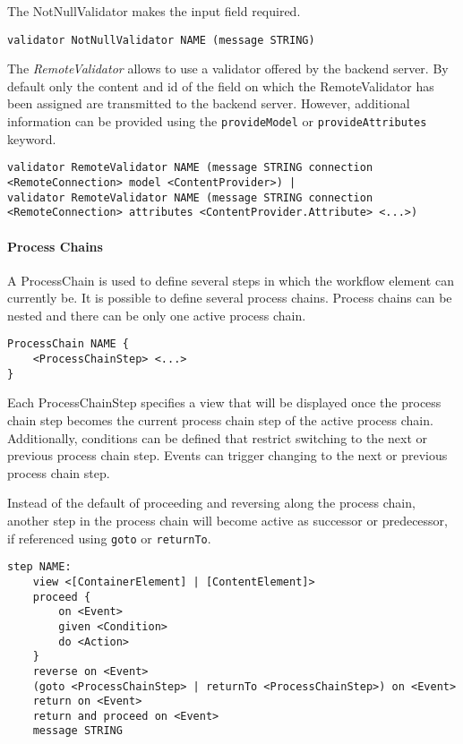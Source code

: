 The NotNullValidator makes the input field required.
\begin{lstlisting}
validator NotNullValidator NAME (message STRING)
\end{lstlisting}

The \textit{RemoteValidator} allows to use a validator offered by the backend server. By default only the content and id of the field on which the RemoteValidator has been assigned are transmitted to the backend server. However, additional information can be provided using the \lstinline!provideModel! or
\lstinline!provideAttributes! keyword.
\begin{lstlisting}
validator RemoteValidator NAME (message STRING connection <RemoteConnection> model <ContentProvider>) |
validator RemoteValidator NAME (message STRING connection <RemoteConnection> attributes <ContentProvider.Attribute> <...>)
\end{lstlisting}

\paragraph{Process Chains}
\label{sec:processChain}
A ProcessChain is used to define several steps in which the workflow element can currently be. It is possible to define several process chains. Process chains can be nested and there can be only one active process chain.
\begin{lstlisting}
ProcessChain NAME {
	<ProcessChainStep> <...>
}
\end{lstlisting}

Each ProcessChainStep specifies a view that will be displayed once the process chain step becomes the current process chain step of the active process chain. Additionally, conditions can be defined that restrict switching to the next or previous process chain step. Events can trigger changing to the next or previous process chain step.
 
Instead of the default of proceeding and reversing along the process chain, another step in the process chain will become active as successor or predecessor, if referenced using \lstinline|goto| or \lstinline|returnTo|.

\begin{lstlisting}
step NAME:
	view <[ContainerElement] | [ContentElement]>
	proceed {
		on <Event>
		given <Condition>
		do <Action>
	}
	reverse on <Event>
	(goto <ProcessChainStep> | returnTo <ProcessChainStep>) on <Event>
	return on <Event>
	return and proceed on <Event>
	message STRING
\end{lstlisting}

